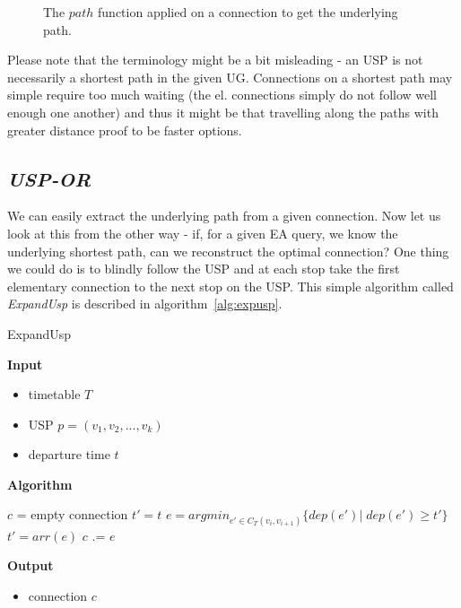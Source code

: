     \begin{figure}[h!]
	\begin{center}
	\end{center}
	\caption{\label{fig:pathfunc} The $path$ function applied on a connection to get the underlying path.}
\end{figure}

\noindent Please note that the terminology might be a bit misleading - an USP is not necessarily a shortest path in the given UG. Connections on a shortest path may simple require too much waiting (the el. connections simply do not follow well enough one another) and thus it might be that travelling along the paths with greater distance proof to be faster options.
	    
\subsection{\textit{USP-OR}}

	We can easily extract the underlying path from a given connection. Now let us look at this from the other way - if, for a given EA query, we know the underlying shortest path, can we reconstruct the optimal connection? One thing we could do is to blindly follow the USP and at each stop take the first elementary connection to the next stop on the USP. This simple algorithm called \textit{ExpandUsp} is described in algorithm~\ref{alg:expusp}. 
	
	\color{algcolor}
	\begin{algorithm}[H]
		\color{inalgcolor}
		\caption{ExpandUsp}
		\label{alg:expusp}
		\textbf{Input} 
		\begin{itemize}
			\item timetable $T$
			\item USP $p = (v_{1}, v_{2}, ..., v_{k})$
			\item departure time $t$
		\end{itemize}
		\textbf{Algorithm}
		\begin{algorithmic}
			\STATE $c$ = empty connection
			\STATE $t' = t$
				\STATE $e = argmin_{e' \in C_{T}(v_{i}, v_{i + 1})} \{dep(e')|\; dep(e') \geq t'\}$ 
				\STATE $t' = arr(e)$
				\STATE $c$ .= $e$ 
			\ENDFOR
		\end{algorithmic}
		\textbf{Output}
		\begin{itemize}
			\item connection $c$
		\end{itemize}
	\end{algorithm}
	\color{black}	
	
